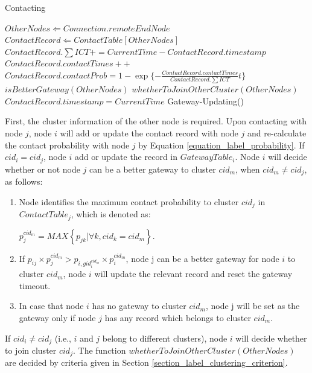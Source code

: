 \documentclass[conference]{IEEEtran}
\begin{document}
\begin{algorithm}[!t]
\caption{Contacting}\label{algorithm_contacting}
\begin{algorithmic}
\STATE $OtherNodes \Leftarrow Connection.remoteEndNode$
\STATE $ContactRecord \Leftarrow ContactTable[OtherNodes]$
\STATE $ContactRecord.\sum ICT += CurrentTime-ContactRecord.timestamp$
\STATE $ContactRecord.contactTimes++$
\STATE $ContactRecord.contactProb =1-\exp\{-\frac{ContactRecord.contactTimes}{ContactRecord.\sum ICT}t\}$
\STATE $isBetterGateway(OtherNodes)$
\STATE $whetherToJoinOtherCluster(OtherNodes)$
\ENDIF
\ELSE[$Connection = destoried$]
\STATE $ContactRecord.timestamp = CurrentTime$
\ENDIF
\ENDFOR
\STATE Gateway-Updating()
\end{algorithmic}
\end{algorithm}

First, the cluster information of the other node is required. Upon contacting with node $j$, node $i$ will add or update the contact record with node $j$ and re-calculate the contact probability with node $j$ by Equation \ref{equation_label_probability}.
If $cid_i=cid_j$, node $i$ add or update the record in $GatewayTable_{i}$. Node $i$ will decide whether or not node $j$ can be a better gateway to cluster $cid_m$, when $cid_m \neq cid_j$, as follows:
\begin{enumerate}
      \item Node identifies the maximum contact probability to cluster $cid_j$ in $ContactTable_j$, which is denoted as:
\begin{center}
    $p_j^{cid_m}=MAX\left\{
    p_{jk}|\forall k,cid_k=cid_m
    \right\}$.
\end{center}
      \item  If $p_{ij}\times p_j^{cid_m}>p_{i,gid_i^{cid_m}}\times p_i^{cid_m}$, node j can be a better gateway for node $i$ to cluster $cid_m$, node $i$ will update the relevant record and reset the gateway timeout.
      \item In case that node $i$ has no gateway to cluster $cid_m$, node j will be set as the gateway only if node $j$ has any record which belongs to cluster $cid_m$.
    \end{enumerate}
If $cid_i \not= cid_j $ (i.e., $i$ and $j$ belong to different clusters), node $i$ will decide whether to join cluster $cid_j$.
The function $whetherToJoinOtherCluster(OtherNodes)$ are decided by criteria given in Section \ref{section_label_clustering_criterion}.
\end{document}

